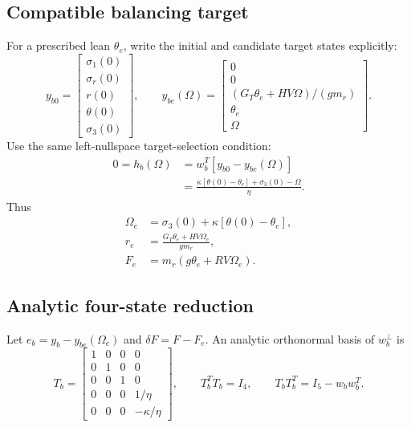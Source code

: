 \subsection{Compatible balancing target}
For a prescribed lean $\theta_e$, write the initial and candidate target
states explicitly:
\begin{equation}
y_{b0}=\begin{bmatrix}
\sigma_1(0)\\\sigma_r(0)\\r(0)\\\theta(0)\\\sigma_3(0)
\end{bmatrix},\qquad
y_{be}(\Omega)=\begin{bmatrix}
0\\0\\(G_T\theta_e+HV\Omega)/(gm_r)\\\theta_e\\\Omega
\end{bmatrix}.
\end{equation}
Use the same left-nullspace target-selection condition:
\begin{equation}
\begin{aligned}
0=h_b(\Omega)
&=w_b^T[y_{b0}-y_{be}(\Omega)]\\
&=\frac{\kappa[\theta(0)-\theta_e]+\sigma_3(0)-\Omega}{\eta}.
\end{aligned}
\end{equation}
Thus
\begin{equation}
\begin{aligned}
\Omega_e&=\sigma_3(0)+\kappa[\theta(0)-\theta_e],\\
r_e&=\frac{G_T\theta_e+HV\Omega_e}{gm_r},\\
F_e&=m_r(g\theta_e+RV\Omega_e).
\end{aligned}
\end{equation}


\subsection{Analytic four-state reduction}
Let $e_b=y_b-y_{be}(\Omega_e)$ and $\delta F=F-F_e$.
An analytic orthonormal basis of $w_b^\perp$ is
\begin{equation}
T_b=\begin{bmatrix}
1&0&0&0\\0&1&0&0\\0&0&1&0\\
0&0&0&1/\eta\\0&0&0&-\kappa/\eta
\end{bmatrix},\qquad
T_b^TT_b=I_4,\qquad T_bT_b^T=I_5-w_bw_b^T.
\end{equation}

